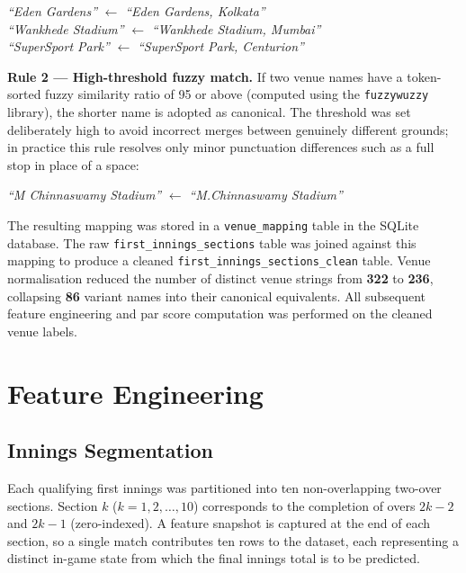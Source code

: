 \begin{center}
\textit{``Eden Gardens''} $\leftarrow$ \textit{``Eden Gardens, Kolkata''} \\
\textit{``Wankhede Stadium''} $\leftarrow$ \textit{``Wankhede Stadium, Mumbai''} \\
\textit{``SuperSport Park''} $\leftarrow$ \textit{``SuperSport Park, Centurion''}
\end{center}

\textbf{Rule 2 --- High-threshold fuzzy match.} If two venue names have a token-sorted fuzzy similarity ratio of 95 or above (computed using the \texttt{fuzzywuzzy} library), the shorter name is adopted as canonical. The threshold was set deliberately high to avoid incorrect merges between genuinely different grounds; in practice this rule resolves only minor punctuation differences such as a full stop in place of a space:

\begin{center}
\textit{``M Chinnaswamy Stadium''} $\leftarrow$ \textit{``M.Chinnaswamy Stadium''}
\end{center}

The resulting mapping was stored in a \texttt{venue\_mapping} table in the SQLite database. The raw \texttt{first\_innings\_sections} table was joined against this mapping to produce a cleaned \texttt{first\_innings\_sections\_clean} table. Venue normalisation reduced the number of distinct venue strings from \textbf{322} to \textbf{236}, collapsing \textbf{86} variant names into their canonical equivalents. All subsequent feature engineering and par score computation was performed on the cleaned venue labels.
\section{Feature Engineering}

\subsection{Innings Segmentation}

Each qualifying first innings was partitioned into ten non-overlapping two-over sections. Section $k$ ($k = 1, 2, \ldots, 10$) corresponds to the completion of overs $2k-2$ and $2k-1$ (zero-indexed). A feature snapshot is captured at the end of each section, so a single match contributes ten rows to the dataset, each representing a distinct in-game state from which the final innings total is to be predicted.

